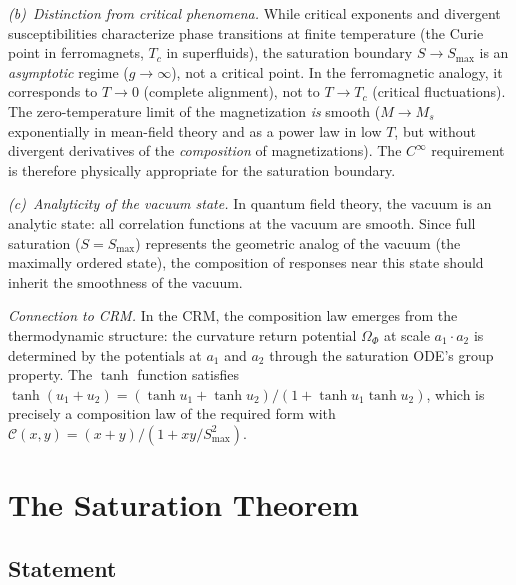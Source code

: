 \documentclass[aps,prd,twocolumn,superscriptaddress,nofootinbib]{revtex4-2}
\begin{document}
\textit{(b)~Distinction from critical phenomena.} While critical exponents and divergent susceptibilities characterize phase transitions at finite temperature (the Curie point in ferromagnets, $T_c$ in superfluids), the saturation boundary $S \to S_{\max}$ is an \textit{asymptotic} regime ($g \to \infty$), not a critical point. In the ferromagnetic analogy, it corresponds to $T \to 0$ (complete alignment), not to $T \to T_c$ (critical fluctuations). The zero-temperature limit of the magnetization \textit{is} smooth ($M \to M_s$ exponentially in mean-field theory and as a power law in low $T$, but without divergent derivatives of the \textit{composition} of magnetizations). The $C^\infty$ requirement is therefore physically appropriate for the saturation boundary.

\textit{(c)~Analyticity of the vacuum state.} In quantum field theory, the vacuum is an analytic state: all correlation functions at the vacuum are smooth. Since full saturation ($S = S_{\max}$) represents the geometric analog of the vacuum (the maximally ordered state), the composition of responses near this state should inherit the smoothness of the vacuum.

\textit{Connection to CRM.} In the CRM, the composition law emerges from the thermodynamic structure: the curvature return potential $\Omega_\Phi$ at scale $a_1 \cdot a_2$ is determined by the potentials at $a_1$ and $a_2$ through the saturation ODE's group property. The $\tanh$ function satisfies $\tanh(u_1 + u_2) = (\tanh u_1 + \tanh u_2)/(1 + \tanh u_1 \tanh u_2)$, which is precisely a composition law of the required form with $\mathcal{C}(x,y) = (x + y)/(1 + xy/S_{\max}^2)$.


\section{The Saturation Theorem}
\label{sec:theorem}

\subsection{Statement}
\end{document}

